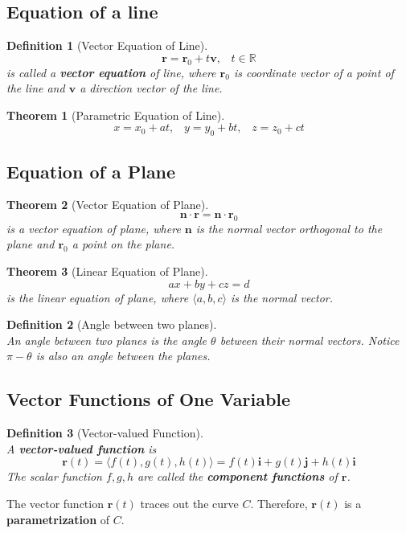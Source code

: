 \documentclass[12pt]{article}
\newtheorem{definition}{Definition}[section]
\newtheorem{theorem}{Theorem}[section]
\theoremstyle{definition}
\newcommand\ve[1]{\mathbf{#1}}
\begin{document}
\subsection{Equation of a line}
\begin{definition}[Vector Equation of Line]
\hfill\\\normalfont
\[
\ve{r}=\ve{r}_0+t\ve{v},\;\;\;t\in\mathbb{R}
\]
is called a \textbf{vector equation} of line, where $\ve{r}_0$ is coordinate vector of a point of the line and $\ve{v}$ a direction vector of the line.
\end{definition}
\begin{theorem}[Parametric Equation of Line]
\[
x=x_0+at,\;\;\;y=y_0+bt,\;\;\;z=z_0+ct
\]
\end{theorem}
\subsection{Equation of a Plane}
\begin{theorem}[Vector Equation of Plane]
\hfill\\\normalfont
\[
\ve{n}\cdot\ve{r} = \ve{n}\cdot\ve{r}_0
\]
is a vector equation of plane, where $\ve{n}$ is the normal vector orthogonal to the plane and $\ve{r}_0$ a point on the plane.
\end{theorem}
\begin{theorem}[Linear Equation of Plane]
\hfill\\\normalfont
\[
ax+by+cz = d
\]
is the linear equation of plane, where $\langle a,b,c\rangle$ is the normal vector.
\end{theorem}
\begin{definition}[Angle between two planes]
\hfill\\\normalfont
An angle between two planes is the angle $\theta$ between their normal vectors. Notice $\pi-\theta$ is also an angle between the planes.
\end{definition}
\subsection{Vector Functions of One Variable}
\begin{definition}[Vector-valued Function]
\hfill\\\normalfont A \textbf{vector-valued function} is
\[
\ve{r}(t)=\langle f(t),g(t),h(t)\rangle = f(t)\ve{i}+g(t)\ve{j}+h(t)\ve{i}
\]
The scalar function $f,g,h$ are called the \textbf{component functions} of $\ve{r}$.
\end{definition}
The vector function $\ve{r}(t)$ traces out the curve $C$. Therefore, $\ve{r}(t)$ is a \textbf{parametrization} of $C$.
\end{document}
